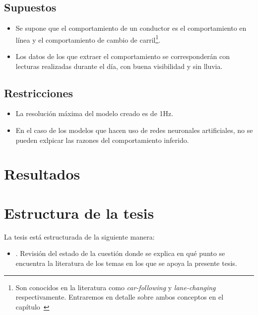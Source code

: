 \subsection{Supuestos}

\begin{itemize}
	\item Se supone que el comportamiento de un conductor es el comportamiento en línea y el comportamiento de cambio de carril\footnote{Son conocidos en la literatura como \textit{car-following} y \textit{lane-changing} respectivamente. Entraremos en detalle sobre ambos conceptos en el capítulo~}.
	\item Los datos de los que extraer el comportamiento se corresponderán con lecturas realizadas durante el día, con buena visibilidad y sin lluvia.
\end{itemize}

\subsection{Restricciones}

\begin{itemize}
	\item La resolución máxima del modelo creado es de 1Hz.
	\item En el caso de los modelos que hacen uso de redes neuronales artificiales, no se pueden exlpicar las razones del comportamiento inferido.
\end{itemize}

\section{Resultados}
\label{ch:intro:results}

\section{Estructura de la tesis}
\label{ch:intro:structure}

La tesis está estructurada de la siguiente manera:

\begin{itemize}
	\item \textbf{}. Revisión del estado de la cuestión donde se explica en qué punto se encuentra la literatura de los temas en los que se apoya la presente tesis.
\end{itemize}
